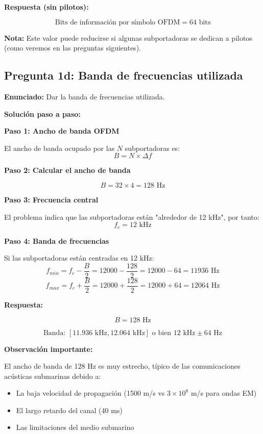 \documentclass[11pt,a4paper]{article}
\begin{document}
\textbf{Respuesta (sin pilotos):}

\[
\boxed{\text{Bits de información por símbolo OFDM} = 64 \text{ bits}}
\]

\textbf{Nota:} Este valor puede reducirse si algunas subportadoras se dedican a pilotos (como veremos en las preguntas siguientes).

\subsection*{Pregunta 1d: Banda de frecuencias utilizada}

\textbf{Enunciado:} Dar la banda de frecuencias utilizada.

\vspace{0.3cm}
\textbf{Solución paso a paso:}

\textbf{Paso 1: Ancho de banda OFDM}

El ancho de banda ocupado por las $N$ subportadoras es:
\[
B = N \times \Delta f
\]

\textbf{Paso 2: Calcular el ancho de banda}

\[
B = 32 \times 4 = 128 \text{ Hz}
\]

\textbf{Paso 3: Frecuencia central}

El problema indica que las subportadoras están "alrededor de 12 kHz", por tanto:
\[
f_c = 12 \text{ kHz}
\]

\textbf{Paso 4: Banda de frecuencias}

Si las subportadoras están centradas en 12 kHz:
\[
f_{min} = f_c - \frac{B}{2} = 12000 - \frac{128}{2} = 12000 - 64 = 11936 \text{ Hz}
\]
\[
f_{max} = f_c + \frac{B}{2} = 12000 + \frac{128}{2} = 12000 + 64 = 12064 \text{ Hz}
\]

\textbf{Respuesta:}

\[
\boxed{B = 128 \text{ Hz}}
\]

\[
\boxed{\text{Banda: } [11.936 \text{ kHz}, 12.064 \text{ kHz}] \text{ o bien } 12 \text{ kHz} \pm 64 \text{ Hz}}
\]

\textbf{Observación importante:}

El ancho de banda de 128 Hz es muy estrecho, típico de las comunicaciones acústicas submarinas debido a:
\begin{itemize}
    \item La baja velocidad de propagación (1500 m/s vs $3\times10^8$ m/s para ondas EM)
    \item El largo retardo del canal (40 ms)
    \item Las limitaciones del medio submarino
\end{itemize}
\end{document}
